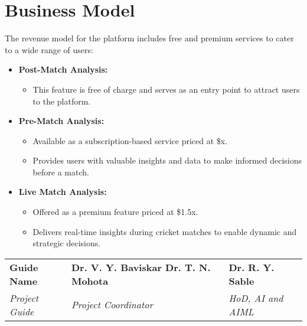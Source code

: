 \section{Business Model}
The revenue model for the platform includes free and premium services to cater to a wide range of users:
\begin{itemize}
    \item \textbf{Post-Match Analysis:} 
    \begin{itemize}
        \item This feature is free of charge and serves as an entry point to attract users to the platform.
    \end{itemize}
    \item \textbf{Pre-Match Analysis:}
    \begin{itemize}
        \item Available as a subscription-based service priced at \$x.
        \item Provides users with valuable insights and data to make informed decisions before a match.
    \end{itemize}
    \item \textbf{Live Match Analysis:}
    \begin{itemize}
        \item Offered as a premium feature priced at \$1.5x.
        \item Delivers real-time insights during cricket matches to enable dynamic and strategic decisions.
    \end{itemize}
\end{itemize}

	
	
	
	


	

\vfill %

\begin{center}
\begin{tabular}{>{\centering\arraybackslash}m{}  %
                >{\centering\arraybackslash}m{}  %
                >{\centering\arraybackslash}m{}} %
    \textbf{Guide Name} & \textbf{Dr. V. Y. Baviskar Dr. T. N. Mohota} & \textbf{Dr. R. Y. Sable} \\ 
    \textit{Project Guide} & \textit{Project Coordinator} & \textit{HoD, AI and AIML} \\
\end{tabular}
\end{center}

